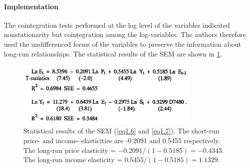 	\paragraph{Implementation\\}{The cointegration tests performed at the log level of the variables indicated nonstationarity but cointegration among the log-variables. The authors therefore used the undifferenced forms of the variables to preserve the information about long-run relationships. The statistical results of the SEM are shown in \cref{fig1.3}.}
	
	\begin{figure}[h]  %
		\centering
		\includegraphics[width=0.8\textwidth]{./figure/ch1/fig1.3_result4.png}
		\caption{Statistical results of the SEM (\cref{eq1.6} and \cref{eq1.7}). The short-run price- and income- elasticities are -0.2091 and 0.5455 respectively. The long-run price elasticity = $-0.2091/(1-0.5185)=-0.4343$. The long-run income elasticity = $0.5455/(1-0.5185)=1.1329$.}\label{fig1.3}
	\end{figure}


